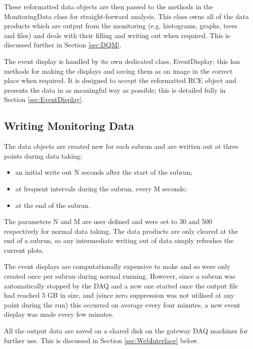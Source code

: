These reformatted data objects are then passed to the methods in the MonitoringData class for straight-forward analysis.  This class owns all of the data products which are output from the monitoring (e.g. histograms, graphs, trees and files) and deals with their filling and writing out when required.  This is discussed further in Section \ref{sec:DQM}.

The event display is handled by its own dedicated class, EventDisplay; this has methods for making the displays and saving them as an image in the correct place when required.  It is designed to accept the reformatted RCE object and presents the data in as meaningful way as possible; this is detailed fully in Section \ref{sec:EventDisplay}.

\subsection{Writing Monitoring Data}\label{sec:WritingMonitoringData}

The data objects are created new for each subrun and are written out at three points during data taking:
\begin{itemize}
\item an initial write out N seconds after the start of the subrun;
\item at frequent intervals during the subrun, every M seconds;
\item at the end of the subrun.
\end{itemize}
The parameters N and M are user defined and were set to 30 and 500 respectively for normal data taking.  The data products are only cleared at the end of a subrun, so any intermediate writing out of data simply refreshes the current plots.

The event displays are computationally expensive to make and so were only created once per subrun during normal running.  However, since a subrun was automatically stopped by the DAQ and a new one started once the output file had reached 5 GB in size, and (since zero suppression was not utilised at any point during the run) this occurred on average every four minutes, a new event display was made every few minutes.

All the output data are saved on a shared disk on the gateway DAQ machines for further use.  This is discussed in Section \ref{sec:WebInterface} below.


